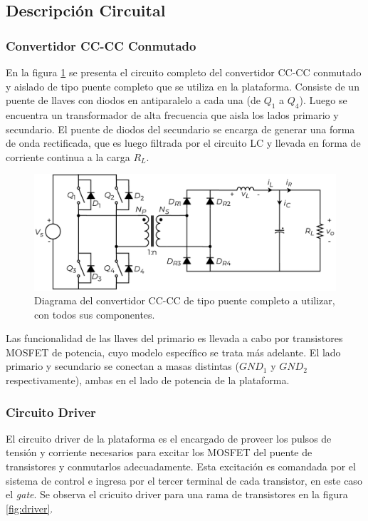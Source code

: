 \subsection{Descripción Circuital}

\subsubsection{Convertidor CC-CC Conmutado}

En la figura \ref{fig:fullbridge} se presenta el circuito completo del convertidor CC-CC conmutado y aislado de tipo puente completo que se utiliza en la plataforma. Consiste de un puente de llaves con diodos en antiparalelo a cada una (de $Q_1$ a $Q_4$). Luego se encuentra un transformador de alta frecuencia que aisla los lados primario y secundario. El puente de diodos del secundario se encarga de generar una forma de onda rectificada, que es luego filtrada por el circuito LC y llevada en forma de corriente continua a la carga $R_L$.\\

\begin{figure}[h]
    \centering
    \includegraphics[scale=0.6]{Imagenes/Full Bridge.pdf}
    \caption{Diagrama del convertidor CC-CC de tipo puente completo a utilizar, con todos sus componentes.}
    \label{fig:fullbridge}
\end{figure}

Las funcionalidad de las llaves del primario es llevada a cabo por transistores MOSFET de potencia, cuyo modelo específico se trata más adelante. El lado primario y secundario se conectan a masas distintas ($GND_1$ y $GND_2$ respectivamente), ambas en el lado de potencia de la plataforma.\\

\subsubsection{Circuito Driver}

El circuito driver de la plataforma es el encargado de proveer los pulsos de tensión y corriente necesarios para excitar los MOSFET del puente de transistores y conmutarlos adecuadamente. Esta excitación es comandada por el sistema de control e ingresa por el tercer terminal de cada transistor, en este caso el \textit{gate}. Se observa el cricuito driver para una rama de transistores en la figura \ref{fig:driver}.\\

